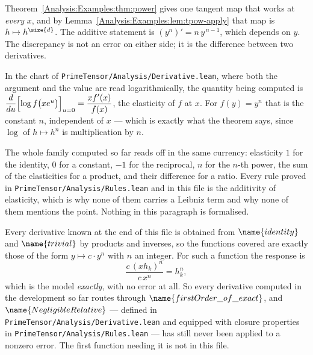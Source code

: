 \begin{designnote}
\label{Analysis:Examples:note:elasticity}
Theorem~\ref{Analysis:Examples:thm:power} gives one tangent map that works at
\emph{every} $x$, and by Lemma~\ref{Analysis:Examples:lem:tpow-apply} that map
is $h \mapsto h^{\size{d}}$.  The additive statement is
$(y^{n})' = n\,y^{\,n-1}$, which depends on $y$.  The discrepancy is not an
error on either side; it is the difference between two derivatives.

In the chart of \texttt{PrimeTensor/Analysis/Derivative.lean}, where both the
argument and the value are read logarithmically, the quantity being computed is
$\dfrac{d}{du}\Bigl[\log f\bigl(x e^{u}\bigr)\Bigr]_{u=0}
 = \dfrac{x f'(x)}{f(x)}$, the elasticity of $f$ at $x$.  For $f(y) = y^{n}$
that is the constant $n$, independent of $x$ --- which is exactly what the
theorem says, since $\log$ of $h \mapsto h^{n}$ is multiplication by $n$.

The whole family computed so far reads off in the same currency: elasticity $1$
for the identity, $0$ for a constant, $-1$ for the reciprocal, $n$ for the
$n$-th power, the sum of the elasticities for a product, and their difference
for a ratio.  Every rule proved in
\texttt{PrimeTensor/Analysis/Rules.lean} and in this file is the additivity of
elasticity, which is why none of them carries a Leibniz term and why none of
them mentions the point.  Nothing in this paragraph is formalised.
\end{designnote}

\begin{remark}
\label{Analysis:Examples:rem:still-exact}
Every derivative known at the end of this file is obtained from
$\name{identity}$ and $\name{trivial}$ by products and inverses, so the
functions covered are exactly those of the form $y \mapsto c \cdot y^{n}$ with
$n$ an integer.  For such a function the response is
\[
  \frac{c\,(x h_k)^{n}}{c\,x^{n}} = h_k^{n},
\]
which is the model \emph{exactly}, with no error at all.  So every derivative
computed in the development so far routes through
$\name{firstOrder\_of\_exact}$, and $\name{NegligibleRelative}$ --- defined in
\texttt{PrimeTensor/Analysis/Derivative.lean} and equipped with closure
properties in \texttt{PrimeTensor/Analysis/Rules.lean} --- has still never been
applied to a nonzero error.  The first function needing it is not in this file.
\end{remark}

